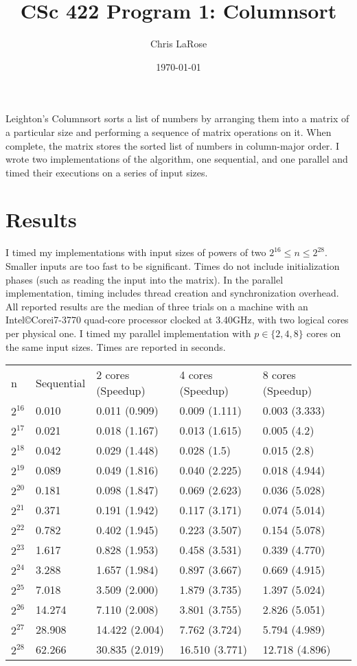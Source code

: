 \documentclass[a4paper]{article}
\title{CSc 422 Program 1: Columnsort}
\author{Chris LaRose}
\date{\today}
\begin{document}
\maketitle


Leighton's Columnsort\cite{leighton} sorts a list of numbers by arranging them into a matrix of a particular size and performing a sequence of matrix operations on it. When complete, the matrix stores the sorted list of numbers in column-major order. I wrote two implementations of the algorithm, one sequential, and one parallel and timed their executions on a series of input sizes.

\section{Results}

I timed my implementations with input sizes of powers of two $2^{16} \leq n \leq 2^{28}$. Smaller inputs are too fast to be significant. Times do not include initialization phases (such as reading the input into the matrix). In the parallel implementation, timing includes thread creation and synchronization overhead. All reported results are the median of three trials on a machine with an Intel\copyright Core\texttrademark i7-3770 quad-core processor clocked at 3.40GHz, with two logical cores per physical one. I timed my parallel implementation with $p \in \{2,4,8\}$ cores on the same input sizes. Times are reported in seconds.

\begin{tabular}{ l l l l l l }
  n & Sequential & 2 cores (Speedup) & 4 cores (Speedup) & 8 cores (Speedup) \\  
  $2^{16}$ & 0.010 & 0.011 (0.909) & 0.009 (1.111) & 0.003 (3.333) \\
  $2^{17}$ & 0.021 & 0.018 (1.167) & 0.013 (1.615) & 0.005 (4.2)   \\
  $2^{18}$ & 0.042 & 0.029 (1.448) & 0.028 (1.5)   & 0.015 (2.8)   \\
  $2^{19}$ & 0.089 & 0.049 (1.816) & 0.040 (2.225) & 0.018 (4.944) \\
  $2^{20}$ & 0.181 & 0.098 (1.847) & 0.069 (2.623) & 0.036 (5.028) \\
  $2^{21}$ & 0.371 & 0.191 (1.942) & 0.117 (3.171) & 0.074 (5.014) \\
  $2^{22}$ & 0.782 & 0.402 (1.945) & 0.223 (3.507) & 0.154 (5.078) \\
  $2^{23}$ & 1.617 & 0.828 (1.953) & 0.458 (3.531) & 0.339 (4.770) \\
  $2^{24}$ & 3.288 & 1.657 (1.984) & 0.897 (3.667) & 0.669 (4.915) \\
  $2^{25}$ & 7.018 & 3.509 (2.000) & 1.879 (3.735) & 1.397 (5.024) \\
  $2^{26}$ & 14.274 & 7.110 (2.008) & 3.801 (3.755) & 2.826 (5.051) \\
  $2^{27}$ & 28.908 & 14.422 (2.004) & 7.762 (3.724) & 5.794 (4.989) \\
  $2^{28}$ & 62.266 & 30.835 (2.019) & 16.510 (3.771) & 12.718 (4.896) \\
\end{tabular}
\end{document}
